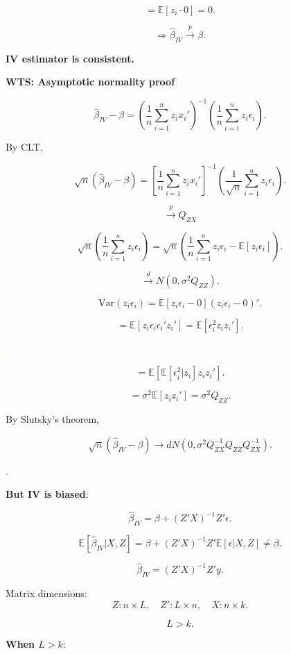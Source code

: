 \documentclass[12pt, oneside]{article}
\begin{document}
\[
= \mathbb{E}[z_i \cdot 0] = 0.
\]

\[
\Rightarrow \hat{\beta}_{IV} \xrightarrow{p} \beta.
\]

\textbf{IV estimator is consistent.}

\textbf{WTS: Asymptotic normality proof}

\[
\hat{\beta}_{IV} - \beta = \left( \frac{1}{n} \sum_{i=1}^{n} z_i x_i' \right)^{-1} \left( \frac{1}{n} \sum_{i=1}^{n} z_i \epsilon_i \right).
\]

By CLT,

\[
\sqrt{n} (\hat{\beta}_{IV} - \beta) = \left[ \frac{1}{n} \sum_{i=1}^{n} z_i x_i' \right]^{-1} \left( \frac{1}{\sqrt{n}} \sum_{i=1}^{n} z_i \epsilon_i \right).
\]

\[
\xrightarrow{p} Q_{ZX}
\]

\[
\sqrt{n} \left( \frac{1}{n} \sum_{i=1}^{n} z_i \epsilon_i \right) = \sqrt{n} \left( \frac{1}{n} \sum_{i=1}^{n} z_i \epsilon_i - \mathbb{E}[z_i \epsilon_i] \right).
\]

\[
\xrightarrow{d} N(0, \sigma^2 Q_{ZZ}).
\]

\[
\text{Var}(z_i \epsilon_i) = \mathbb{E} [ z_i \epsilon_i - 0 ] (z_i \epsilon_i - 0)'.
\]

\[
= \mathbb{E} [ z_i \epsilon_i \epsilon_i' z_i' ] = \mathbb{E} [ \epsilon_i^2 z_i z_i' ].
\]

\textcolor{yellow}{.}

\[
= \mathbb{E} [ \mathbb{E} [\epsilon_i^2 | z_i] z_i z_i' ].
\]

\[
= \sigma^2 \mathbb{E} [ z_i z_i' ] = \sigma^2 Q_{ZZ}.
\]

By Slutsky's theorem,

\[
\sqrt{n} (\hat{\beta}_{IV} - \beta) \rightarrow d N(0, \sigma^2 Q_{ZX}^{-1} Q_{ZZ} Q_{ZX}^{-1}).
\]

\textcolor{red}{.}

\textbf{But IV is biased}:

\[
\hat{\beta}_{IV} = \beta + (Z'X)^{-1} Z' \epsilon.
\]

\[
\mathbb{E}[\hat{\beta}_{IV} | X, Z] = \beta + (Z'X)^{-1} Z' \mathbb{E}[\epsilon | X, Z] \neq \beta.
\]

\[
\hat{\beta}_{IV} = (Z'X)^{-1} Z' y.
\]

Matrix dimensions:
\[
Z: n \times L, \quad Z': L \times n, \quad X: n \times k.
\]

\[
L > k.
\]

\textbf{When \( L > k \)}:
\end{document}
